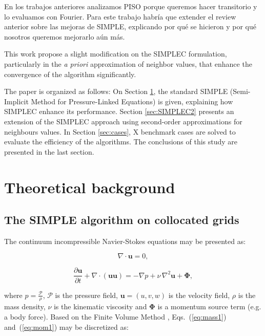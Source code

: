 \documentclass[final,3p,times,10pt,onecolumn]{myElsarticle}
\numberwithin{equation}{section}
\newcommand{\COM}[1]{{\color{green} #1}}
\newcommand{\CIP}[1]{{\color{blue} #1}}
\begin{document}
\CIP{En los trabajos anteriores analizamos PISO porque queremos hacer transitorio y lo evaluamos con Fourier. Para este trabajo habría que extender el review anterior sobre las mejoras de SIMPLE, explicando por qué se hicieron y por qué nosotros queremos mejorarlo aún más.}


This work propose \CIP{a slight modification on the SIMPLEC formulation, particularly in the \textit{a priori} approximation of neighbor values, that enhance the convergence of the algorithm significantly}.

The paper is organized as follows: On Section \ref{sec:theory}, the standard SIMPLE (Semi-Implicit Method for Pressure-Linked Equations) is given, explaining how SIMPLEC enhance its performance. Section \ref{sec:SIMPLEC2} presents an extension of the SIMPLEC approach using second-order approximations for neighbours values. In Section \ref{sec:cases}, \COM{X} benchmark cases are solved to evaluate the efficiency of the algorithms. The conclusions of this study are presented in the last section.


\section{Theoretical background} \label{sec:theory}

\subsection{The SIMPLE algorithm on collocated grids}

The continuum incompressible Navier-Stokes equations may be presented as:

\begin{equation}
\displaystyle \nabla \cdotp \boldsymbol{u} = 0, 
\label{eq:mass1}
\end{equation}

\begin{equation}
\displaystyle \frac{\partial \boldsymbol{u}}{\partial t} + \nabla \cdotp (\boldsymbol{u} \boldsymbol{u}) = -\nabla p + \nu\, \nabla^2 \boldsymbol{u} + \boldsymbol{\Phi},
\label{eq:mom1}
\end{equation}

\noindent where $\displaystyle p = \frac{\mathcal{P}}{\rho}$, $\mathcal{P}$ is the pressure field, $\boldsymbol{u} = (u,v,w)$ is the velocity field, {\color{red}$\rho$ is the mass density, }$\nu$ is the kinematic viscosity and $\mathbf{\Phi}$ is a momentum source term (e.g. a body force).
Based on the Finite Volume Method \cite{jasak}, Eqs.~(\ref{eq:mass1}) and~(\ref{eq:mom1}) may be discretized as:
\end{document}
